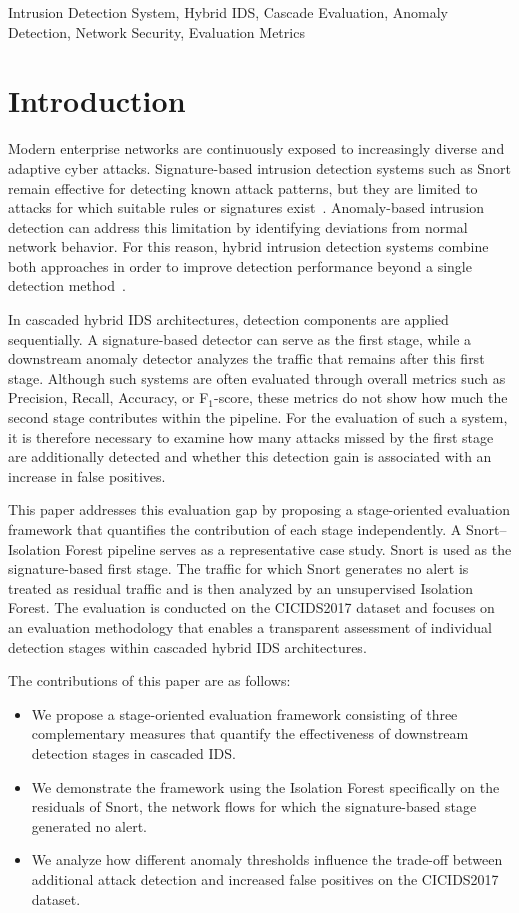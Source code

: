 \documentclass[conference]{IEEEtran}
\begin{document}
\begin{IEEEkeywords}
Intrusion Detection System, 
Hybrid IDS,
Cascade Evaluation,
Anomaly Detection, 
Network Security, 
Evaluation Metrics
\end{IEEEkeywords}

\section{Introduction}
\label{sec:introduction}

Modern enterprise networks are continuously exposed to increasingly diverse and adaptive cyber attacks. Signature-based intrusion detection systems such as Snort remain effective for detecting known attack patterns, but they are limited to attacks for which suitable rules or signatures exist~\cite{roesch1999}. Anomaly-based intrusion detection can address this limitation by identifying deviations from normal network behavior. For this reason, hybrid intrusion detection systems combine both approaches in order to improve detection performance beyond a single detection method~\cite{maseno2022}.

In cascaded hybrid IDS architectures, detection components are applied sequentially. A signature-based detector can serve as the first stage, while a downstream anomaly detector analyzes the traffic that remains after this first stage. Although such systems are often evaluated through overall metrics such as Precision, Recall, Accuracy, or F$_1$-score, these metrics do not show how much the second stage contributes within the pipeline. For the evaluation of such a system, it is therefore necessary to examine how many attacks missed by the first stage are additionally detected and whether this detection gain is associated with an increase in false positives.

This paper addresses this evaluation gap by proposing a stage-oriented evaluation framework that quantifies the contribution of each stage independently. A Snort–Isolation Forest pipeline serves as a representative case study. Snort is used as the signature-based first stage. The traffic for which Snort generates no alert is treated as residual traffic and is then analyzed by an unsupervised Isolation Forest. The evaluation is conducted on the CICIDS2017 dataset and focuses on an evaluation methodology that enables a transparent assessment of individual detection stages within cascaded hybrid IDS architectures.

The contributions of this paper are as follows:
\begin{itemize}
    \item We propose a stage-oriented evaluation framework consisting of three complementary measures that quantify the effectiveness of downstream detection stages in cascaded IDS.
    \item We demonstrate the framework using the Isolation Forest specifically on the residuals of Snort, the network flows for which the signature-based stage generated no alert.
    \item We analyze how different anomaly thresholds influence the trade-off between additional attack detection and increased false positives on the CICIDS2017 dataset.
\end{itemize}
\end{document}
